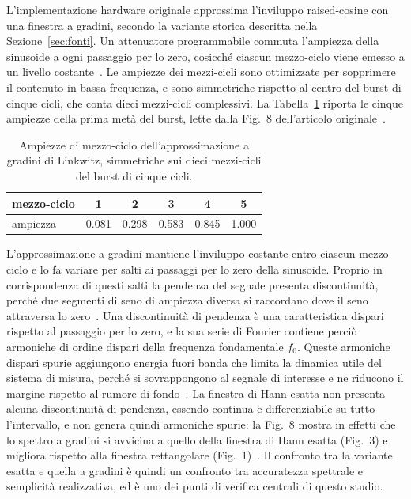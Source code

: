\documentclass[11pt,a4paper]{article}
\begin{document}
L'implementazione hardware originale approssima l'inviluppo raised-cosine con una finestra a gradini, secondo la variante storica descritta nella Sezione~\ref{sec:fonti}.
Un attenuatore programmabile commuta l'ampiezza della sinusoide a ogni passaggio per lo zero, cosicché ciascun mezzo-ciclo viene emesso a un livello costante~\cite{linkwitz1980shaped}.
Le ampiezze dei mezzi-cicli sono ottimizzate per sopprimere il contenuto in bassa frequenza, e sono simmetriche rispetto al centro del burst di cinque cicli, che conta dieci mezzi-cicli complessivi.
La Tabella~\ref{tab:staircase} riporta le cinque ampiezze della prima metà del burst, lette dalla Fig.~8 dell'articolo originale~\cite{linkwitz1980shaped}.

\begin{table}[h]\centering
\begin{tabular}{lccccc}
\toprule
mezzo-ciclo & 1 & 2 & 3 & 4 & 5 \\
\midrule
ampiezza & 0.081 & 0.298 & 0.583 & 0.845 & 1.000 \\
\bottomrule
\end{tabular}
\caption{Ampiezze di mezzo-ciclo dell'approssimazione a gradini di Linkwitz, simmetriche sui dieci mezzi-cicli del burst di cinque cicli.}
\label{tab:staircase}
\end{table}

L'approssimazione a gradini mantiene l'inviluppo costante entro ciascun mezzo-ciclo e lo fa variare per salti ai passaggi per lo zero della sinusoide.
Proprio in corrispondenza di questi salti la pendenza del segnale presenta discontinuità, perché due segmenti di seno di ampiezza diversa si raccordano dove il seno attraversa lo zero~\cite{linkwitz1980shaped}.
Una discontinuità di pendenza è una caratteristica dispari rispetto al passaggio per lo zero, e la sua serie di Fourier contiene perciò armoniche di ordine dispari della frequenza fondamentale $f_0$.
Queste armoniche dispari spurie aggiungono energia fuori banda che limita la dinamica utile del sistema di misura, perché si sovrappongono al segnale di interesse e ne riducono il margine rispetto al rumore di fondo~\cite{linkwitz1978narrowband}.
La finestra di Hann esatta non presenta alcuna discontinuità di pendenza, essendo continua e differenziabile su tutto l'intervallo, e non genera quindi armoniche spurie: la Fig.~8 mostra in effetti che lo spettro a gradini si avvicina a quello della finestra di Hann esatta (Fig.~3) e migliora rispetto alla finestra rettangolare (Fig.~1)~\cite{linkwitz1980shaped}.
Il confronto tra la variante esatta e quella a gradini è quindi un confronto tra accuratezza spettrale e semplicità realizzativa, ed è uno dei punti di verifica centrali di questo studio.
\end{document}
